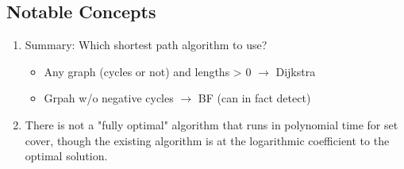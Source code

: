 \subsection{Notable Concepts}

\begin{enumerate}
    \item Summary: Which shortest path algorithm to use?
        \begin{itemize}
            \item Any graph (cycles or not) and lengths > 0 $\rightarrow$ Dijkstra
            \item Grpah w/o negative cycles $\rightarrow$ BF (can in fact detect)
        \end{itemize}
    \item There is not a "fully optimal" algorithm that runs in polynomial time for set cover, though the existing algorithm is at the logarithmic coefficient to the optimal solution.
\end{enumerate}


